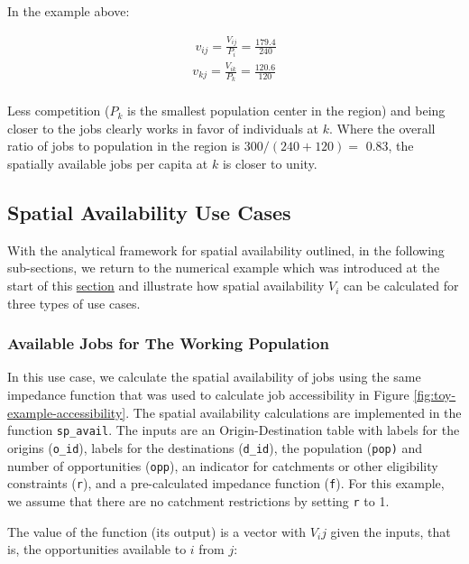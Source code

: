 \documentclass[]{elsarticle} %
\begin{document}
In the example above:

\[
\begin{array}{l}\
v_{ij} = \frac{V_{ij}}{P_i} =  \frac{179.4}{240}\\
v_{kj} =  \frac{V_{ik}}{P_k} =  \frac{120.6}{120}\\
\end{array}
\]

Less competition (\(P_k\) is the smallest population center in the
region) and being closer to the jobs clearly works in favor of
individuals at \(k\). Where the overall ratio of jobs to population in
the region is \(300/(240 + 120)=\) 0.83, the spatially available jobs
per capita at \(k\) is closer to unity.

\hypertarget{spatial-availability-use-cases}{%
\subsection{Spatial Availability Use
Cases}\label{spatial-availability-use-cases}}

With the analytical framework for spatial availability outlined, in the
following sub-sections, we return to the numerical example which was
introduced at the start of this
\protect\hyperlink{accessibility-numerical-example}{section} and
illustrate how spatial availability \(V_i\) can be calculated for three
types of use cases.

\hypertarget{available-jobs-for-the-working-population}{%
\subsubsection{Available Jobs for The Working
Population}\label{available-jobs-for-the-working-population}}

In this use case, we calculate the spatial availability of jobs using
the same impedance function that was used to calculate job accessibility
in Figure \ref{fig:toy-example-accessibility}. The spatial availability
calculations are implemented in the function \texttt{sp\_avail}. The
inputs are an Origin-Destination table with labels for the origins
(\texttt{o\_id}), labels for the destinations (\texttt{d\_id}), the
population (\texttt{pop)} and number of opportunities (\texttt{opp}), an
indicator for catchments or other eligibility constraints (\texttt{r}),
and a pre-calculated impedance function (\texttt{f}). For this example,
we assume that there are no catchment restrictions by setting \texttt{r}
to 1.

The value of the function (its output) is a vector with \(V_ij\) given
the inputs, that is, the opportunities available to \(i\) from \(j\):
\end{document}
